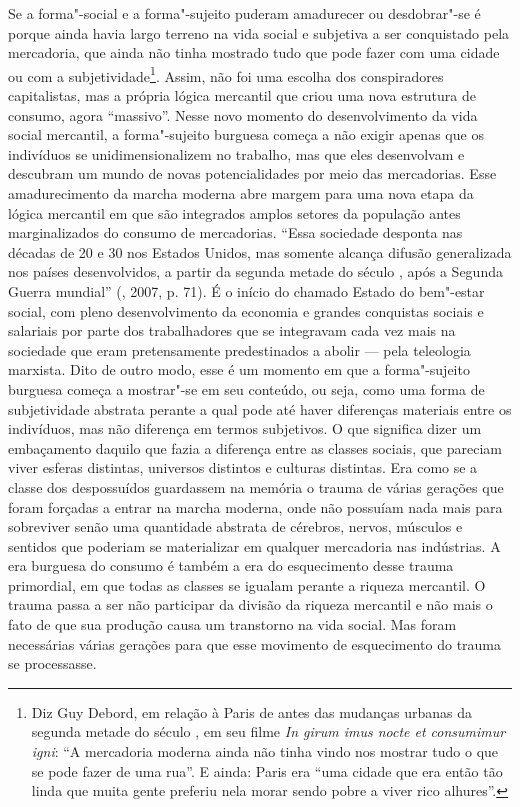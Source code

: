 Se a forma"-social e a forma"-sujeito puderam amadurecer ou desdobrar"-se é
porque ainda havia largo terreno na vida social e subjetiva a ser
conquistado pela mercadoria, que ainda não tinha mostrado tudo que pode
fazer com uma cidade ou com a subjetividade\footnote{Diz Guy Debord, em
  relação à Paris de antes das mudanças urbanas da segunda metade do
  século , em seu filme \emph{In girum imus nocte et consumimur igni}:
  ``A mercadoria moderna ainda não tinha vindo nos mostrar tudo o que se
  pode fazer de uma rua''. E ainda: Paris era ``uma cidade que era então
  tão linda que muita gente preferiu nela morar sendo pobre a viver rico
  alhures''.}. Assim, não foi uma escolha dos conspiradores
capitalistas, mas a própria lógica mercantil que criou uma nova
estrutura de consumo, agora ``massivo''. Nesse novo momento do
desenvolvimento da vida social mercantil, a forma"-sujeito burguesa
começa a não exigir apenas que os indivíduos se unidimensionalizem no
trabalho, mas que eles desenvolvam e descubram um mundo de novas
potencialidades por meio das mercadorias. Esse amadurecimento da marcha
moderna abre margem para uma nova etapa da lógica mercantil em que são
integrados amplos setores da população antes marginalizados do consumo
de mercadorias. ``Essa sociedade desponta nas décadas de 20 e 30 nos
Estados Unidos, mas somente alcança difusão generalizada nos países
desenvolvidos, a partir da segunda metade do século , após a Segunda
Guerra mundial'' (, 2007, p. 71). É o início do chamado Estado
do bem"-estar social, com pleno desenvolvimento da economia e grandes
conquistas sociais e salariais por parte dos trabalhadores que se
integravam cada vez mais na sociedade que eram pretensamente
predestinados a abolir --- pela teleologia marxista. Dito de outro modo,
esse é um momento em que a forma"-sujeito burguesa começa a mostrar"-se em
seu conteúdo, ou seja, como uma forma de subjetividade abstrata perante
a qual pode até haver diferenças materiais entre os indivíduos, mas não
diferença em termos subjetivos. O que significa dizer um embaçamento
daquilo que fazia a diferença entre as classes sociais, que pareciam
viver esferas distintas, universos distintos e culturas distintas. Era
como se a classe dos despossuídos guardassem na memória o trauma de
várias gerações que foram forçadas a entrar na marcha moderna, onde não
possuíam nada mais para sobreviver senão uma quantidade abstrata de
cérebros, nervos, músculos e sentidos que poderiam se materializar em
qualquer mercadoria nas indústrias. A era burguesa do consumo é também a
era do esquecimento desse trauma primordial, em que todas as classes se
igualam perante a riqueza mercantil. O trauma passa a ser não participar
da divisão da riqueza mercantil e não mais o fato de que sua produção
causa um transtorno na vida social. Mas foram necessárias várias
gerações para que esse movimento de esquecimento do trauma se
processasse.

